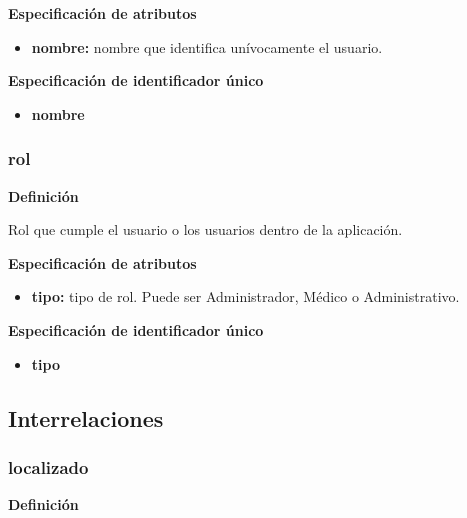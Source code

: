 \documentclass[a4paper,11pt]{article}
\begin{document}
\textbf{Especificación de atributos}

\begin{itemize}

     \item \textbf{nombre:} nombre que identifica unívocamente el usuario. 

\end{itemize}

\textbf{Especificación de identificador único}

\begin{itemize}

     \item \textbf{nombre}

\end{itemize}

\subsubsection{\textbf{rol}}

\textbf{Definición}

Rol que cumple el usuario o los usuarios dentro de la aplicación.

\textbf{Especificación de atributos}

\begin{itemize}

     \item \textbf{tipo:} tipo de rol. Puede ser Administrador, Médico o Administrativo. 

\end{itemize}

\textbf{Especificación de identificador único}

\begin{itemize}

     \item \textbf{tipo}

\end{itemize}



\subsection{\textbf{Interrelaciones}}

\subsubsection{\textbf{localizado}}

\textbf{Definición}
\end{document}
